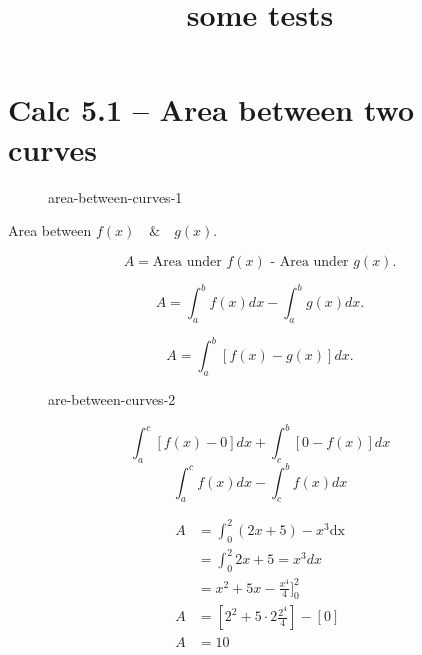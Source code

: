 \documentclass{book}
\title{some tests}
\author{}
\date{}
\begin{document}
\maketitle
\tableofcontents


\chapter{Calc 5.1 -- Area between two curves}


\begin{figure}[ht]
    \centering
    \caption{area-between-curves-1}
    \label{fig:area-between-curves-1}
\end{figure}

Area between $f(x)\quad \& \quad g(x)$.

\[ A= \text{Area under $f(x)$ - Area under $g(x)$} .\] 

\[ A= \int^b_a f(x) dx - \int^b_a g(x) dx .\] 

\[
    A=\int^b_a \left[f(x)-g(x)\right] dx
.\] 



\begin{figure}[htbp]
    \centering
    \caption{are-between-curves-2}
    \label{fig:are-between-curves-2}
\end{figure}

\[ \int_{a}^{c} \left[ f(x)-0 \right] dx + \int_{c}^{b}  \left[ 0-f(x) \right] dx \] 
\[ \int_{a}^{c}  f(x) dx - \int_{c}^{b} f(x) dx \] 





\begin{align*}
A &=\int_{0}^{2}  (2x+5) - x^3 \text{dx}\\
&= \int_{0}^{2}2x+5=x^3 dx   \\
&= x^2+5x - \frac{x^4}{4}]^2_0  \\
A &= \left[ 2^2+5\cdot 2 \frac{2^4}{4} \right] - \left[ 0 \right]   \\
A&= 10 \\
\end{align*}
\end{document}

